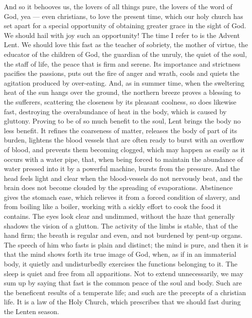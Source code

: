 And so it behooves us, the lovers of all things 
pure, the lovers of the word of God, yea — even 
christians, to love the present time, which our 
holy church has set apart for a special opportunity
of obtaining greater grace in the sight 
of God. We should hail with joy such an opportunity!
The time I refer to is the Advent 
Lent. We should love this fast as the teacher 
of sobriety, the mother of virtue, the educator 
of the children of God, the guardian of the 
unruly, the quiet of the soul, the staff of life, the 
peace that is firm and serene. Its importance 
and strictness pacifies the passions, puts out 
the fire of anger and wrath, cools and quiets the 
agitation produced by over-eating. And, as in 
summer time, when the sweltering heat of the
sun hangs over the ground, the northern breeze 
proves a blessing to the sufferers, scattering the 
closeness by its pleasant coolness, so does likewise
fast, destroying the overabundance of heat 
in the body, which is caused by gluttony. Proving
to be of so much benefit to the soul, Lent 
brings the body no less benefit. It refines the 
coarseness of matter, releases the body of part 
of its burden, lightens the blood vessels that 
are often ready to burst with an overflow of 
blood, and prevents them becoming clogged, 
which may happen as easily as it occurs with a 
water pipe, that, when being forced to maintain 
the abundance of water pressed into it by a 
powerful machine, bursts from the pressure. 
And the head feels light and clear when the 
blood-vessels do not nervously beat, and the 
brain does not become clouded by the spreading 
of evaporations. Abstinence gives the stomach 
ease, which relieves it from a forced condition
of slavery, and from boiling like a boiler, 
working with a sickly effort to cook the food it 
contains. The eyes look clear and undimmed, 
without the haze that generally shadows the 
vision of a glutton. The activity of the limbs 
is stable, that of the hand firm; the breath is 
regular and even, and not burdened by pent-up 
organs. The speech of him who fasts is plain 
and distinct; the mind is pure, and then it is 
that the mind shows forth its true image of 
God, when, as if in an immaterial body, it 
quietly and undisturbedly exercises the functions
belonging to it. The sleep is quiet and 
free from all apparitions. Not to extend 
unnecessarily, we may sum up by saying that 
fast is the common peace of the soul and body. 
Such are the beneficent results of a temperate 
life; and such are the precepts of a christian 
life. It is a law of the Holy Church, which 
prescribes that we should fast during the Lenten 
season. 

